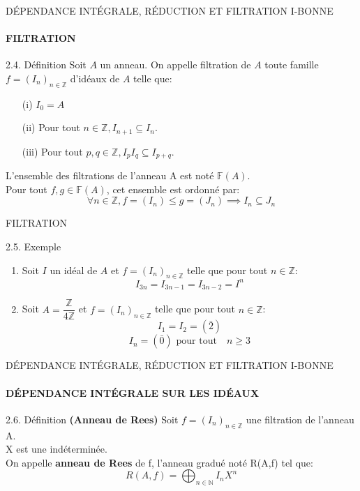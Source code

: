 \documentclass[11pt,a4paper]{beamer}
\begin{document}
\begin{frame}{DÉPENDANCE INTÉGRALE, RÉDUCTION ET FILTRATION I-BONNE}
	\framesubtitle{FILTRATION}
	\begin{block}{2.4. Définition}
		Soit $A$ un anneau. On appelle filtration de $A$ toute famille $f = (I_n)_{n \in \mathbb{Z}}$ d'idéaux de $A$ telle que:
		\begin{enumerate}
			\item[(i)] $I_0 = A$ \pause
			\item[(ii)] Pour tout $n \in \mathbb{Z}, I_{n+1} \subseteq I_n$.\pause
			\item[(iii)] Pour tout $p,q \in \mathbb{Z}, I_pI_q \subseteq I_{p+q}$.\pause
		\end{enumerate}
		L'ensemble des filtrations de l'anneau A est noté $\mathbb{F}(A)$.\\ Pour tout $f,g \in \mathbb{F}(A)$, cet ensemble est ordonné par: \pause
		\[\forall n \in \mathbb{Z}, f = (I_n) \leqslant g = (J_n) \implies  I_n \subseteq J_n \] 
	\end{block}
\end{frame}

\begin{frame}{FILTRATION}
	\begin{block}{2.5. Exemple}
		\begin{enumerate}
			\item 	Soit $I$ un idéal de $A$ et $f=(I_n)_{n \in \mathbb{Z}}$ telle que pour tout $n \in \mathbb{Z}$:
			$$I_{3n} = I_{3n-1} = I_{3n-2} =I^{n} $$ \pause
			\item 	Soit $A = \dfrac{\mathbb{Z}}{4 \mathbb{Z}} $ et $f=(I_n)_{n \in \mathbb{Z}}$ telle que pour tout $n \in \mathbb{Z}$:
			$$I_1 = I_2 = (\bar{2})$$ \pause
			$$I_n = (\bar{0})  \text{ pour tout} \quad n \geqslant 3 $$ \pause
		\end{enumerate}
	\end{block}
\end{frame}


\begin{frame}{DÉPENDANCE INTÉGRALE, RÉDUCTION ET FILTRATION I-BONNE}
	\framesubtitle{DÉPENDANCE INTÉGRALE SUR LES IDÉAUX}
	\begin{block}{2.6. Définition \textbf{(Anneau de Rees)}}
	Soit $f=(I_n)_{n \in \mathbb{Z}}$ une filtration de l'anneau A.\\ X est une indéterminée.\\
	On appelle \textbf{anneau de Rees} de f, l'anneau gradué noté R(A,f) tel que: 
	\[ R(A,f)  =\displaystyle \bigoplus_{n \in \mathbb{N}}{I_n X^n}  \]
	\end{block}
\end{frame}
\end{document}
